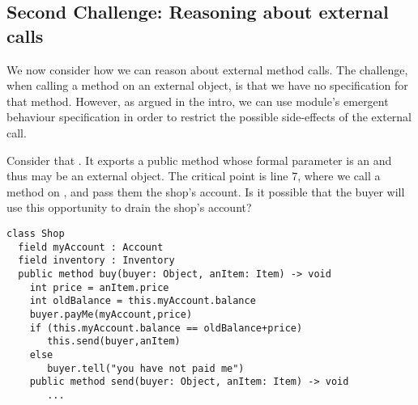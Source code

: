  \subsection{Second Challenge: Reasoning about external calls}
\label{sec:how}

{We now consider how we can reason about external method calls. 
The challenge, when calling a method on an external object, is that we have no specification for that method. 
However, as argued in the intro, we can use  module's emergent behaviour  specification   in order to restrict the possible side-effects of the external call.
}

 
 
Consider that  . It exports a public method  whose formal parameter  is an  and thus may be an external object. 
The critical point is line 7, where we call a method on , and pass them the shop's account.
Is it possible that the buyer will use this opportunity  to drain the shop's account?
 




%
 

\begin{lstlisting}
class Shop
  field myAccount : Account
  field inventory : Inventory    
  public method buy(buyer: Object, anItem: Item) -> void
    int price = anItem.price
    int oldBalance = this.myAccount.balance
    buyer.payMe(myAccount,price)
    if (this.myAccount.balance == oldBalance+price)
       this.send(buyer,anItem)
    else
       buyer.tell("you have not paid me") 
    public method send(buyer: Object, anItem: Item) -> void  
       ...            
\end{lstlisting}
 
